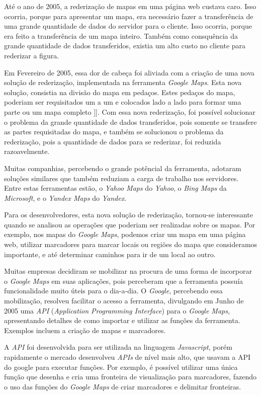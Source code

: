 Até o ano de 2005, a rederização de mapas em uma página web custava caro. Isso ocorria,
porque para apresentar um mapa, era necessário fazer a transferência de uma grande
quantidade de dados do servidor para o cliente. Isso ocorria, porque era feito a
transferência de um mapa inteiro. Também como consquência da grande quantidade de dados
transferidos, existia um alto custo no cliente para rederizar a figura.

Em Fevereiro de 2005, essa dor de cabeça foi aliviada com a criação
de uma nova solução de rederização, implementada na ferramenta \emph{Google Maps}. Esta nova
solução, consistia na divisão do mapa em pedaços. Estes pedaços do mapa, poderiam ser
requisitados um a um e colocados lado a lado para formar uma parte ou um mapa completo
]]. Com essa nova rederização,
foi possível solucionar o problema da grande quantidade de dados transferidos, pois
somente se transfere as partes requisitadas do mapa, e também se solucionou o problema
da rederização, pois a quantidade de dados para se rederizar, foi reduzida razoavelmente.

Muitas companhias, percebendo o grande potêncial da ferramenta, adotaram soluções similares
que também reduziam a carga de trabalho nos servidores. Entre estas ferramentas estão, o
\emph{Yahoo Maps} do \emph{Yahoo}, o \emph{Bing Maps} da \emph{Microsoft}, e o
\emph{Yandex Maps} do \emph{Yandex}.

Para os desenvolvedores, esta nova solução de rederização, tornou-se interessante
quando se analisou as operações que poderiam ser realizadas sobre os mapas. Por exemplo, nos
mapas do \emph{Google Maps}, podemos criar um mapa em uma página web, utilizar marcadores para
marcar locais ou regiões do mapa que consideramos importante, e até determinar caminhos
para ir de um local ao outro.

Muitas empresas decidiram se mobilizar na procura de uma forma de incorporar o
\emph{Google Maps} em suas aplicações, pois perceberam que a ferramenta possuía funcionalidade
muito úteis para o dia-a-dia. O \emph{Google}, percebendo essa mobilização, resolveu facilitar
o acesso a ferramenta, divulgando em Junho de 2005 uma \emph{API}
(\emph{Application Programming Interface}) para o \emph{Google Maps}, apresentando
detalhes de como importar e utilizar as funções da ferramenta. Exemplos incluem a criação de
mapas e marcadores.

A \emph{API} foi desenvolvida para ser utilizada na linguagem \emph{Javascript}, porém rapidamente
o mercado desenvolveu \emph{APIs} de nível mais alto, que usavam a API do google para executar
funções. Por exemplo, é possível utilizar uma única função que desenha e cria uma fronteira
de visualização para marcadores, fazendo o uso das funções do \emph{Google Maps}
de criar marcadores e delimitar fronteiras.


